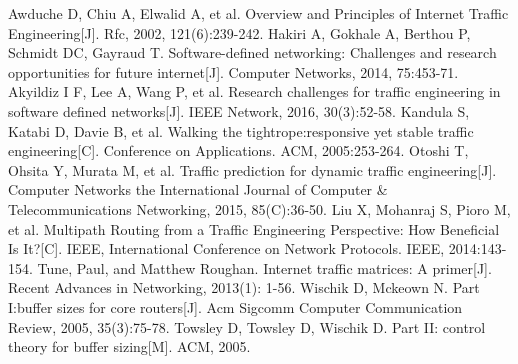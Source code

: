 \documentclass[a4paper]{article}
\begin{document}
\newpage
\begin{thebibliography}{0}

	
	 Awduche D, Chiu A, Elwalid A, et al. Overview and Principles of Internet Traffic Engineering[J]. Rfc, 2002, 121(6):239-242.
	 Hakiri A, Gokhale A, Berthou P, Schmidt DC, Gayraud T. Software-defined networking: Challenges and research opportunities for future internet[J]. Computer Networks, 2014, 75:453-71.
	 Akyildiz I F, Lee A, Wang P, et al. Research challenges for traffic engineering in software defined networks[J]. IEEE Network, 2016, 30(3):52-58.
	 Kandula S, Katabi D, Davie B, et al. Walking the tightrope:responsive yet stable traffic engineering[C]. Conference on Applications. ACM, 2005:253-264.
	 Otoshi T, Ohsita Y, Murata M, et al. Traffic prediction for dynamic traffic engineering[J]. Computer Networks the International Journal of Computer \& Telecommunications Networking, 2015, 85(C):36-50.
	 Liu X, Mohanraj S, Pioro M, et al. Multipath Routing from a Traffic Engineering Perspective: How Beneficial Is It?[C]. IEEE, International Conference on Network Protocols. IEEE, 2014:143-154.
	 Tune, Paul, and Matthew Roughan. Internet traffic matrices: A primer[J]. Recent Advances in Networking, 2013(1): 1-56.
	 Wischik D, Mckeown N. Part I:buffer sizes for core routers[J]. Acm Sigcomm Computer Communication Review, 2005, 35(3):75-78.
	 Towsley D, Towsley D, Wischik D. Part II: control theory for buffer sizing[M]. ACM, 2005.
	
\end{thebibliography}
\end{document}
